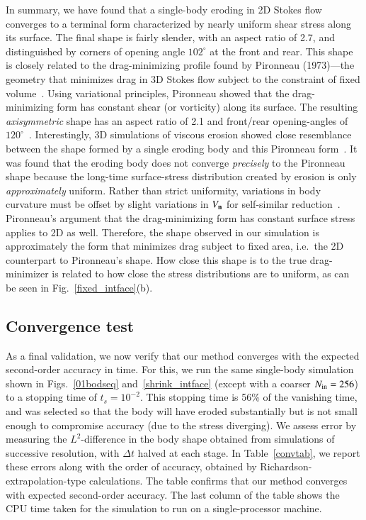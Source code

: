 \documentclass[preprint, 10pt]{elsarticle}
\begin{document}
In summary, we have found that a single-body eroding in 2D Stokes flow converges to a terminal form characterized by nearly uniform shear stress along its surface. The final shape is fairly slender, with an aspect ratio of 2.7, and distinguished by  corners of opening angle $102^{\circ}$ at the front and rear. This shape is closely related to the drag-minimizing profile found by Pironneau (1973)---the geometry that minimizes drag in 3D Stokes flow subject to the constraint of fixed volume~\cite{pir1973}. Using variational principles, Pironneau showed that the drag-minimizing form has constant shear (or vorticity) along its surface. The resulting {\em axisymmetric} shape has an aspect ratio of 2.1 and front/rear opening-angles of $120^{\circ}$~\cite{pir1973, mit-spa2016}.  Interestingly, 3D simulations of viscous erosion showed close resemblance between the shape formed by a single eroding body and this Pironneau form~\cite{mit-spa2016}. It was found that the eroding body does not converge {\em precisely} to the Pironneau shape because the long-time surface-stress distribution created by erosion is only {\em approximately} uniform. Rather than strict uniformity, variations in body curvature must be offset by slight variations in $V_{\mathbf{n}}$ for self-similar reduction~\cite{pir1973, mit-spa2016}. Pironneau's argument that the drag-minimizing form has constant surface stress applies to 2D as well. Therefore, the shape observed in our simulation is approximately the form that minimizes drag subject to fixed area, i.e.~the 2D counterpart to Pironneau's shape. How close this shape is to the true drag-minimizer is related to how close the stress distributions are to uniform, as can be seen in Fig.~\ref{fixed_intface}(b).  

\subsection{Convergence test}
As a final validation, we now verify that our method converges with the expected second-order accuracy in time. For this, we run the same single-body simulation shown in Figs.~\ref{01bodseq} and~\ref{shrink_intface} (except with a coarser $N_{\mathrm{in}}=256$) to a stopping time of $t_s = 10^{-2}$. This stopping time is 56\% of the vanishing time, and was selected so that the body will have eroded substantially but is not small enough to compromise accuracy (due to the stress diverging).  We assess error by measuring the $L^2$-difference in the body shape obtained from simulations of successive resolution, with $\Delta t$ halved at each stage. In Table~\ref{convtab}, we report these errors along with the order of accuracy, obtained by Richardson-extrapolation-type calculations. The table confirms that our method converges with expected second-order accuracy. The last column of the table shows the CPU time taken for the simulation to run on a single-processor machine.
\end{document}
